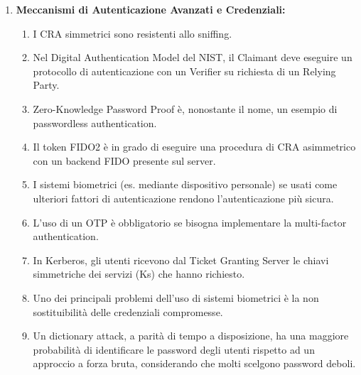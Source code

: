 \documentclass[11pt,a4paper]{article}
\begin{document}
\begin{questionbox}
\begin{enumerate}[label=\textbf{1.\arabic*}]
    \item \textbf{Meccanismi di Autenticazione Avanzati e Credenziali:}
    \begin{enumerate}[label=\alph*.]
        \item I CRA simmetrici sono resistenti allo sniffing.
        \item Nel Digital Authentication Model del NIST, il Claimant deve eseguire un protocollo di autenticazione con un Verifier su richiesta di un Relying Party.
        \item Zero-Knowledge Password Proof \`e, nonostante il nome, un esempio di passwordless authentication.
        \item Il token FIDO2 \`e in grado di eseguire una procedura di CRA asimmetrico con un backend FIDO presente sul server.
        \item I sistemi biometrici (es. mediante dispositivo personale) se usati come ulteriori fattori di autenticazione rendono l'autenticazione pi\`u sicura.
        \item L'uso di un OTP \`e obbligatorio se bisogna implementare la multi-factor authentication.
        \item In Kerberos, gli utenti ricevono dal Ticket Granting Server le chiavi simmetriche dei servizi (Ks) che hanno richiesto.
        \item Uno dei principali problemi dell'uso di sistemi biometrici \`e la non sostituibilit\`a delle credenziali compromesse.
        \item Un dictionary attack, a parit\`a di tempo a disposizione, ha una maggiore probabilit\`a di identificare le password degli utenti rispetto ad un approccio a forza bruta, considerando che molti scelgono password deboli.
    \end{enumerate}
\end{enumerate}
\end{questionbox}
\end{document}
